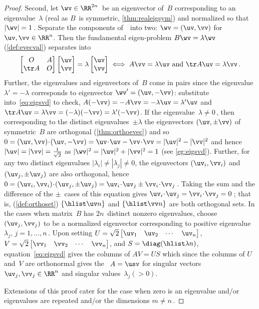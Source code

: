\begin{proof}
Second, let \(\wv\in\RR^{2n}\)\ be an eigenvector of~\(B\) corresponding to an eigenvalue~\(\lambda\) (real as \(B\)~is symmetric, \autoref{thm:realeigsym}) and normalized so that \(|\wv|=1\)\,.
Separate the components of~\wv\ into two: \(\wv=(\uv,\vv)\) for \(\uv,\vv\in\RR^n\).
Then the fundamental eigen-problem \(B\wv=\lambda\wv\)  (\autoref{def:evecval}) separates into
\begin{equation}
\begin{bmatrix} O& A\\\tr A&O \end{bmatrix}\begin{bmatrix} \uv\\\vv \end{bmatrix}=\lambda\begin{bmatrix} \uv\\\vv \end{bmatrix}
\iff  A\vv=\lambda\uv \text{ and }\tr A\uv=\lambda\vv\,.
\label{eq:eigsvd}
\end{equation}
Further, the eigenvalues and eigenvectors of~\(B\) come in pairs since the eigenvalue \(\lambda'=-\lambda\) corresponds to eigenvector \(\wv'=(\uv,-\vv)\): substitute into~\eqref{eq:eigsvd} to check, \(A(-\vv)=-A\vv=-\lambda\uv=\lambda'\uv\) and \(\tr A\uv=\lambda\vv=(-\lambda)(-\vv)=\lambda'(-\vv)\).
If the eigenvalue~\(\lambda\neq0\)\,, then corresponding to the distinct eigenvalues~\(\pm\lambda\) the eigenvectors \((\uv,\pm\vv)\) of symmetric~\(B\) are orthogonal (\autoref{thm:orthoevec}) and so \(0=(\uv,\vv)\cdot(\uv,-\vv)=\uv\cdot\uv-\vv\cdot\vv=|\uv|^2-|\vv|^2\) and hence \(|\uv|=|\vv|=\frac1{\sqrt2}\) as \(|\wv|^2=|\uv|^2+|\vv|^2=1\) (see \autoref{eg:eigsvd}).
Further, for any two distinct eigenvalues \(|\lambda_i|\neq|\lambda_j|\neq 0\), the eigenvectors \((\uv_i,\vv_i)\) and \((\uv_j,\pm\uv_j)\) are also orthogonal, hence \(0 =(\uv_i,\vv_i)\cdot(\uv_j,\pm\uv_j) =\uv_i\cdot\uv_j \pm\vv_i\cdot\vv_j\)\,.
Taking the sum and the difference of the \(\pm\)~cases of this equation gives \(\uv_i\cdot\uv_j=\vv_i\cdot\vv_j=0\)\,; that is,  (\autoref{def:orthoset}) \(\{\hlist\uv n\}\) and \(\{\hlist\vv n\}\) are both orthogonal sets.
In the cases when matrix~\(B\) has \(2n\)~distinct nonzero eigenvalues, choose \((\uv_j,\vv_j)\) to be a normalized eigenvector corresponding to positive eigenvalue~\(\lambda_j\), \(j=1,\ldots,n\)\,. 
Upon setting \(U=\sqrt2\begin{bmatrix} \uv_1&\uv_2&\cdots&\uv_n \end{bmatrix}\), \(V=\sqrt2\begin{bmatrix} \vv_1&\vv_2&\cdots&\vv_n \end{bmatrix}\), and \(S=\diag(\hlist\lambda n)\), equation~\eqref{eq:eigsvd} gives the columns of \(AV=US\) which since the columns of \(U\) and~\(V\) are orthonormal gives the \svd\ \(A=\usv\) for singular vectors \(\uv_j,\vv_j\in\RR^n\) and singular values~\(\lambda_j(>0)\).

Extensions of this proof cater for the case when zero is an eigenvalue and/or eigenvalues are repeated and/or the dimensions \(m\neq n\)\,.
\end{proof}



